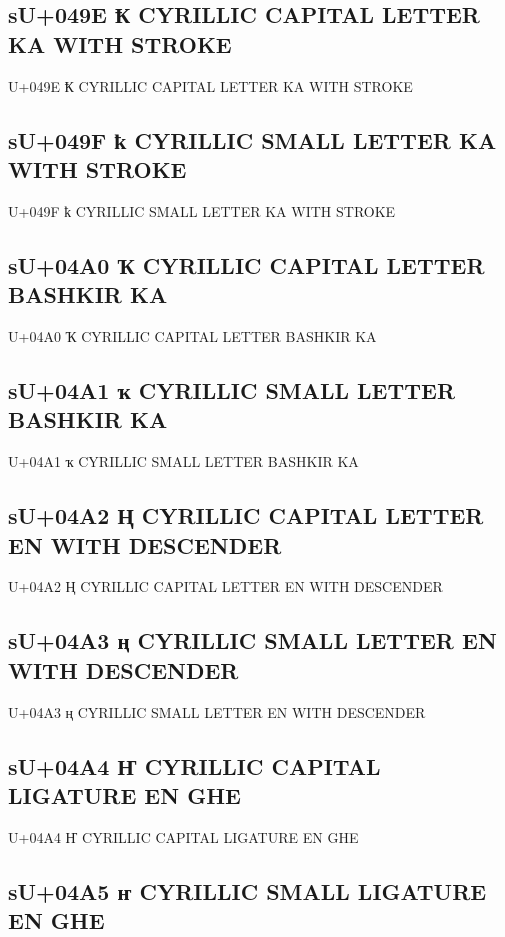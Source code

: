 \subsection{sU+049E Ҟ  CYRILLIC CAPITAL LETTER KA WITH STROKE}

U+049E Ҟ  CYRILLIC CAPITAL LETTER KA WITH STROKE

\subsection{sU+049F ҟ  CYRILLIC SMALL LETTER KA WITH STROKE}

U+049F ҟ  CYRILLIC SMALL LETTER KA WITH STROKE

\subsection{sU+04A0 Ҡ  CYRILLIC CAPITAL LETTER BASHKIR KA}

U+04A0 Ҡ  CYRILLIC CAPITAL LETTER BASHKIR KA

\subsection{sU+04A1 ҡ  CYRILLIC SMALL LETTER BASHKIR KA}

U+04A1 ҡ  CYRILLIC SMALL LETTER BASHKIR KA

\subsection{sU+04A2 Ң  CYRILLIC CAPITAL LETTER EN WITH DESCENDER}

U+04A2 Ң  CYRILLIC CAPITAL LETTER EN WITH DESCENDER

\subsection{sU+04A3 ң  CYRILLIC SMALL LETTER EN WITH DESCENDER}

U+04A3 ң  CYRILLIC SMALL LETTER EN WITH DESCENDER

\subsection{sU+04A4 Ҥ  CYRILLIC CAPITAL LIGATURE EN GHE}

U+04A4 Ҥ  CYRILLIC CAPITAL LIGATURE EN GHE

\subsection{sU+04A5 ҥ  CYRILLIC SMALL LIGATURE EN GHE}

